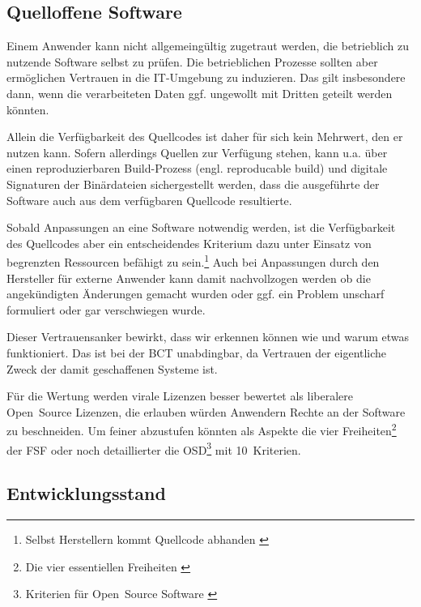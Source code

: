 \subsection{Quelloffene Software}\label{krit:opensource}

Einem Anwender kann nicht allgemeingültig zugetraut werden, die betrieblich zu nutzende Software selbst zu prüfen. Die betrieblichen Prozesse sollten aber ermöglichen Vertrauen in die IT-Umgebung zu induzieren. Das gilt insbesondere dann, wenn die verarbeiteten Daten ggf. ungewollt mit Dritten geteilt werden könnten.

Allein die Verfügbarkeit des Quellcodes ist daher für sich kein Mehrwert, den er nutzen kann.
Sofern allerdings Quellen zur Verfügung stehen, kann u.a. über einen reproduzierbaren Build-Prozess (engl. reproducable build) und digitale Signaturen der Binärdateien sichergestellt werden, dass die ausgeführte der Software auch aus dem verfügbaren Quellcode resultierte.

Sobald Anpassungen an eine Software notwendig werden, ist die Verfügbarkeit des Quellcodes aber ein entscheidendes Kriterium dazu unter Einsatz von begrenzten Ressourcen befähigt zu sein.\footnote{Selbst Herstellern kommt Quellcode abhanden \autocite{w:ms-binpatch}}
Auch bei Anpassungen durch den Hersteller für externe Anwender kann damit nachvollzogen werden ob die angekündigten Änderungen gemacht wurden oder ggf. ein Problem unscharf formuliert oder gar verschwiegen wurde.

Dieser Vertrauensanker bewirkt, dass wir erkennen können wie und warum etwas funktioniert.
Das ist bei der \gls{BCT} unabdingbar, da Vertrauen der eigentliche Zweck der damit geschaffenen Systeme ist.

Für die Wertung werden virale Lizenzen besser bewertet als liberalere Open~Source Lizenzen, die erlauben würden Anwendern Rechte an der Software zu beschneiden.
Um feiner abzustufen könnten als Aspekte die vier Freiheiten\footnote{Die vier essentiellen Freiheiten \autocite{w:fsf-freedoms}} der \gls{FSF}
oder noch detaillierter die \gls{OSD}\footnote{Kriterien für Open~Source Software \autocite{w:iso-osd}} mit 10~Kriterien.

\subsection{Entwicklungsstand}\label{krit:entwicklungsstand}

